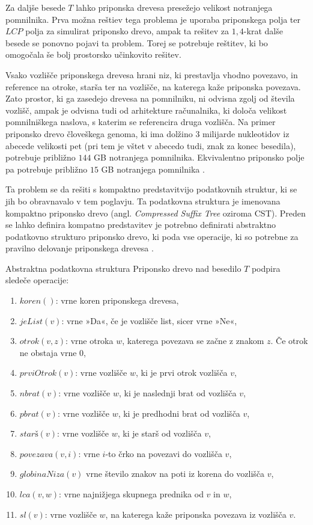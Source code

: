 Za daljše besede $T$ lahko priponska drevesa presežejo velikost notranjega pomnilnika. Prva možna reštiev tega problema je uporaba priponskega polja ter $LCP$ polja za simulirat priponsko drevo, ampak ta rešitev za $1,4$-krat dalše besede se ponovno pojavi ta problem. Torej se potrebuje reštitev, ki bo omogočala še bolj prostorsko učinkovito rešitev. 

Vsako vozlišče priponskega drevesa hrani niz, ki prestavlja vhodno povezavo, in reference na otroke, starša ter na vozlišče, na katerega kaže priponska povezava. Zato prostor, ki ga zasedejo drevesa na pomnilniku, ni odvisna zgolj od števila vozlišč, ampak je odvisna tudi od arhitekture računalnika, ki določa velikost pomnilniškega naslova, s katerim se referencira druga vozlišča. Na primer priponsko drevo človeškega genoma, ki ima dolžino 3 milijarde nukleotidov iz abecede velikosti pet (pri tem je vštet v abecedo tudi, znak za konec besedila), potrebuje približno $144$ GB notranjega pomnilnika. Ekvivalentno priponsko polje pa potrebuje približno $15$ GB notranjega pomnilnika \cite{GENOMEKNOWLEDGEHUB-2024-10-30}.

Ta problem se da rešiti s kompaktno predstavitvijo podatkovnih struktur, ki se jih bo obravnavalo v tem poglavju. Ta podatkovna struktura je imenovana kompaktno priponsko drevo (angl. \textit{Compressed Suffix Tree} oziroma CST). Preden se lahko definira kompatno predstavitev je potrebno definirati abstraktno podatkovno strukturo priponsko drevo, ki poda vse operacije, ki so potrebne za pravilno delovanje priponskega drevesa \cite{Sadakane2007}.

\begin{defi}\label{def:AST}
    Abstraktna podatkovna struktura Priponsko drevo nad besedilo $T$ podpira sledeče operacije:
    \begin{enumerate}
        \item $koren()$: vrne koren priponskega drevesa,
        \item $jeList(v)$: vrne »Da«, če je vozlišče list, sicer vrne »Ne«,
        \item $otrok(v,z)$: vrne otroka $w$, katerega povezava se začne z znakom $z$. Če otrok ne obstaja vrne 0,
        \item $prviOtrok(v)$: vrne vozlišče $w$, ki je prvi otrok vozlišča $v$,
        \item $nbrat(v)$: vrne vozlišče $w$, ki je naslednji brat od vozlišča $v$,
        \item $pbrat(v)$: vrne vozlišče $w$, ki je predhodni brat od vozlišča $v$,
        \item $star\textit{š}(v)$: vrne vozlišče $w$, ki je starš od vozlišča $v$,
        \item $povezava(v,i)$: vrne $i$-to črko na povezavi do vozlišča $v$,
        \item $globinaNiza(v)$ vrne število znakov na poti iz korena do vozlišča $v$,
        \item $lca(v,w)$: vrne najnižjega skupnega prednika od $v$ in $w$,
        \item $sl(v)$: vrne vozlišče $w$, na katerega kaže priponska povezava iz vozlišča $v$.
    \end{enumerate}
\end{defi}

